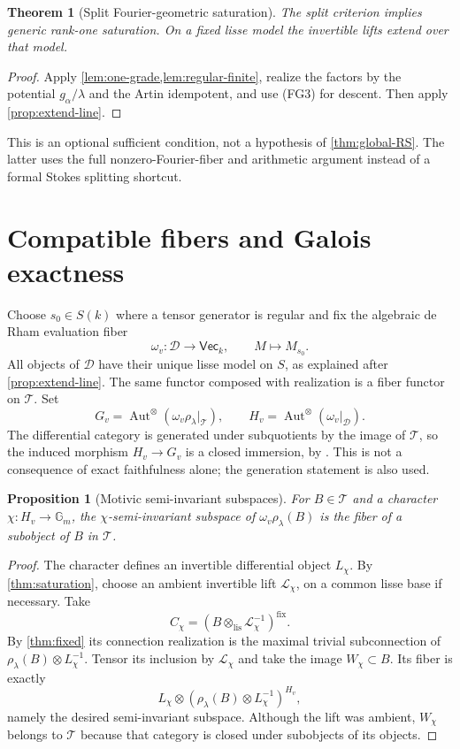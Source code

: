 \documentclass[11pt]{article}
\numberwithin{equation}{section}
\newtheorem{theorem}{Theorem}[section]
\newtheorem{proposition}[proposition]{Proposition}
\theoremstyle{definition}
\theoremstyle{remark}
\newcommand{\Gm}{\mathbb G_m}
\newcommand{\Tcal}{\mathcal T}
\newcommand{\Dcal}{\mathcal D}
\newcommand{\VecCat}{\mathsf{Vec}}
\newcommand{\Aut}{\operatorname{Aut}}
\newcommand{\lis}{\mathrm{lis}}
\newcommand{\fix}{\mathrm{fix}}
\begin{document}
\begin{theorem}[Split Fourier-geometric saturation]\label{thm:split-saturation}
The split criterion implies generic rank-one saturation. On a fixed lisse
model the invertible lifts extend over that model.
\end{theorem}
\begin{proof}
Apply \cref{lem:one-grade,lem:regular-finite}, realize the factors by the
potential $g_\alpha/\lambda$ and the Artin idempotent, and use
\textup{(FG3)} for descent. Then apply \cref{prop:extend-line}.
\end{proof}

This is an optional sufficient condition, not a hypothesis of
\cref{thm:global-RS}. The latter uses the full nonzero-Fourier-fiber and
arithmetic argument instead of a formal Stokes splitting shortcut.



\section{Compatible fibers and Galois exactness}\label{sec:galois}\label{sec:Tannaka}

Choose $s_0\in S(k)$ where a tensor generator is regular and fix the
algebraic de Rham evaluation fiber
\[
 \omega_v:\Dcal\longrightarrow\VecCat_k,\qquad M\longmapsto M_{s_0}.
\]
All objects of $\Dcal$ have their unique lisse model on $S$, as explained
after \cref{prop:extend-line}. The same functor composed with realization
is a fiber functor on $\Tcal$. Set
\[
 G_v=\Aut^\otimes(\omega_v\rho_\lambda|_{\Tcal}),\qquad
 H_v=\Aut^\otimes(\omega_v|_{\Dcal}).
\]
The differential category is generated under subquotients by the image of
$\Tcal$, so the induced morphism $H_v\to G_v$ is a closed immersion,
by \cite[Proposition~2.21(b)]{DeligneMilne}. This is not a consequence
of exact faithfulness alone; the generation statement is also used.

\begin{proposition}[Motivic semi-invariant subspaces]\label{prop:semi}\label{prop:semi-invariants}
For $B\in\Tcal$ and a character $\chi:H_v\to\Gm$, the
$\chi$-semi-invariant subspace of $\omega_v\rho_\lambda(B)$ is the
fiber of a subobject of $B$ in $\Tcal$.
\end{proposition}
\begin{proof}
The character defines an invertible differential object $L_\chi$.
By \cref{thm:saturation}, choose an ambient invertible lift
$\mathcal L_\chi$, on a common lisse base if necessary. Take
\[
 C_\chi=(B\otimes_{\lis}\mathcal L_\chi^{-1})^{\fix}.
\]
By \cref{thm:fixed} its connection realization is the maximal trivial
subconnection of $\rho_\lambda(B)\otimes L_\chi^{-1}$. Tensor its
inclusion by $\mathcal L_\chi$ and take the image $W_\chi\subset B$.
Its fiber is exactly
\[
 L_\chi\otimes
 (\rho_\lambda(B)\otimes L_\chi^{-1})^{H_v},
\]
namely the desired semi-invariant subspace. Although the lift was ambient,
$W_\chi$ belongs to $\Tcal$ because that category is closed under
subobjects of its objects.
\end{proof}
\end{document}
